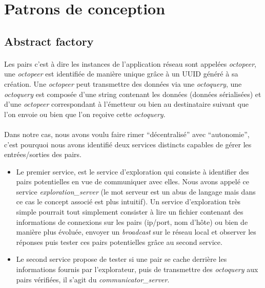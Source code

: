 \documentclass[a4paper]{article}
\begin{document}
		\newpage

	\section{Patrons de conception}
	
		\subsection{Abstract factory}
		
			\paragraph{}{
			Les pairs c’est à dire les instances de l’application réseau sont appelées \textit{octopeer}, 
			une \textit{octopeer} est identifiée de manière unique grâce à un UUID généré à sa création.
			Une \textit{octopeer} peut transmettre des données via une \textit{octoquery}, une \textit{octoquery} est
			composée d’une string contenant les données (données sérialisées) et d’une \textit{octopeer} correspondant à 
			 l’émetteur ou bien au destinataire suivant que l’on envoie ou bien que l’on reçoive cette \textit{octoquery}.
			}
			
			\paragraph{}{
			Dans notre cas, nous avons voulu faire rimer “décentralisé” avec “autonomie”, c’est pourquoi nous 
			avons identifié deux services distincts capables de gérer les entrées/sorties des pairs.
			}
			\begin{itemize}
				\item Le premier service, est le service d’exploration qui consiste à identifier des pairs
				potentielles en vue de communiquer avec elles. Nous avons appelé ce service \textit{exploration\_server} 
				(le mot serveur est un abus de langage mais dans ce cas le concept associé est plus intuitif). 
				Un service d’exploration très simple pourrait tout simplement consister à lire un fichier contenant
				des informations de connexions sur les pairs (ip/port, nom d’hôte) ou bien de manière plus évoluée, 
				envoyer un \textit{broadcast} sur le réseau local et observer les réponses puis tester ces pairs 
				potentielles grâce au second service.
				
				\item Le second service propose de tester si une pair se cache derrière les informations fournis 
				par l’explorateur, puis de transmettre des \textit{octoquery} aux pairs vérifiées, il s’agit du \textit{communicator\_server}.
			\end{itemize}
			
\end{document}
